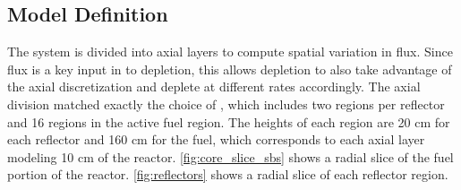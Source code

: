 \documentclass[letterpaper]{physor2024}
\begin{document}
\subsection{Model Definition}\label{sec:model_def}
The system is divided into axial layers to compute spatial variation in flux. Since flux is a key input in to depletion, this allows depletion to also take advantage of the axial discretization and deplete at different rates accordingly. The axial division matched exactly the choice of \cite{Abdelhameed-ANS-2022}, which includes two regions per reflector and 16 regions in the active fuel region. The heights of each region are 20 cm for each reflector and 160 cm for the fuel, which corresponds to each axial layer modeling 10 cm of the reactor. \cref{fig:core_slice_sbs} shows a radial slice of the fuel portion of the reactor. \cref{fig:reflectors} shows a radial slice of each reflector region.
\end{document}

